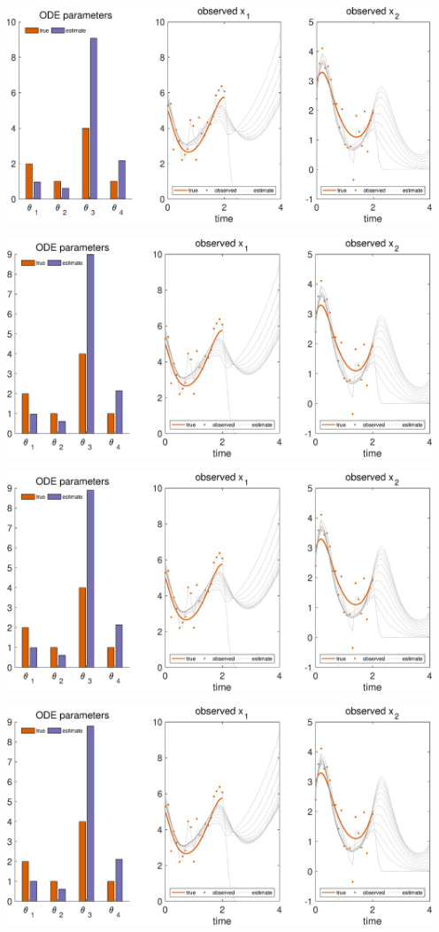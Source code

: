 {\includegraphics [width=5in]{VGM_for_Lotka_Volterra_10.eps}

\includegraphics [width=5in]{VGM_for_Lotka_Volterra_11.eps}

\includegraphics [width=5in]{VGM_for_Lotka_Volterra_12.eps}

\includegraphics [width=5in]{VGM_for_Lotka_Volterra_13.eps}

}
